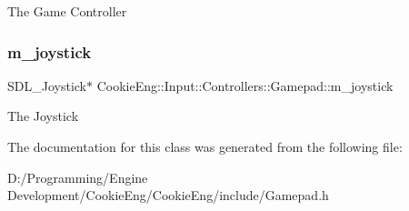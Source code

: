 The Game Controller \mbox{\label{class_cookie_eng_1_1_input_1_1_controllers_1_1_gamepad_a99f1f8985a1d1174bb1c48cfe0f5b6e8}} 
\subsubsection{\texorpdfstring{m\+\_\+joystick}{m\_joystick}}
{\footnotesize\ttfamily S\+D\+L\+\_\+\+Joystick$\ast$ Cookie\+Eng\+::\+Input\+::\+Controllers\+::\+Gamepad\+::m\+\_\+joystick\hspace{0.3cm}{\ttfamily [protected]}}

The Joystick 

The documentation for this class was generated from the following file\+:\begin{DoxyCompactItemize}
\item 
D\+:/\+Programming/\+Engine Development/\+Cookie\+Eng/\+Cookie\+Eng/include/Gamepad.\+h\end{DoxyCompactItemize}
